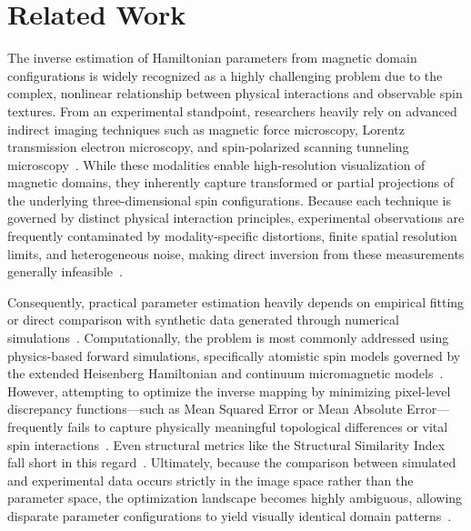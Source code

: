 \documentclass[a4paper,fleqn]{cas-sc}
\begin{document}
\section{Related Work}\label{sec:related}

The inverse estimation of Hamiltonian parameters from magnetic domain configurations is widely recognized as a highly challenging problem due to the complex, nonlinear relationship between physical interactions and observable spin textures. From an experimental standpoint, researchers heavily rely on advanced indirect imaging techniques such as magnetic force microscopy, Lorentz transmission electron microscopy, and spin-polarized scanning tunneling microscopy~\cite{nguyen2022cooperative}. While these modalities enable high-resolution visualization of magnetic domains, they inherently capture transformed or partial projections of the underlying three-dimensional spin configurations. Because each technique is governed by distinct physical interaction principles, experimental observations are frequently contaminated by modality-specific distortions, finite spatial resolution limits, and heterogeneous noise, making direct inversion from these measurements generally infeasible~\cite{zhao2025overview, gaida2023lorentz}. 

Consequently, practical parameter estimation heavily depends on empirical fitting or direct comparison with synthetic data generated through numerical simulations~\cite{zeng2022direct, altaf2024applications}. Computationally, the problem is most commonly addressed using physics-based forward simulations, specifically atomistic spin models governed by the extended Heisenberg Hamiltonian and continuum micromagnetic models~\cite{d2023micromagnetic, lepadatu2021micromagnetic, silva2024three}. However, attempting to optimize the inverse mapping by minimizing pixel-level discrepancy functions—such as Mean Squared Error or Mean Absolute Error—frequently fails to capture physically meaningful topological differences or vital spin interactions~\cite{mongwe2021adaptive, talapatra2022understanding}. Even structural metrics like the Structural Similarity Index fall short in this regard~\cite{karnatov2025analysis}. Ultimately, because the comparison between simulated and experimental data occurs strictly in the image space rather than the parameter space, the optimization landscape becomes highly ambiguous, allowing disparate parameter configurations to yield visually identical domain patterns~\cite{yin2023computational}.
\end{document}
